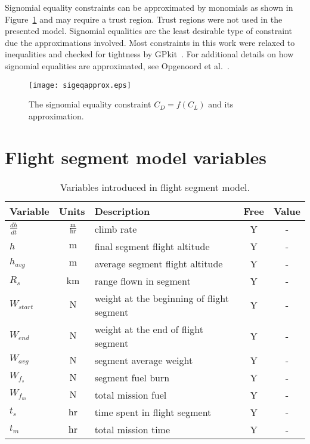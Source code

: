 Signomial equality constraints can be approximated by monomials as shown in
Figure~\ref{f:sigeq} and may require a trust region. Trust regions were not
used in the presented model. Signomial equalities are the least desirable type
of constraint due the approximations involved. Most constraints in this work
were relaxed to inequalities and checked for tightness by GPkit~\cite{gpkit}. For
additional details on how signomial equalities are approximated, see Opgenoord
et al.~\cite{sigeqpaper}.

\begin{figure}[!ht]
\centering
\texttt{[image: sigeqapprox.eps]}
\caption{The signomial equality constraint $C_{D} = f(C_{L})$ and its
approximation.}\label{f:sigeq}
\end{figure}

\section{Flight segment model variables}
\label{a:flightprofilevars}

\begin{footnotesize}
    \begin{table}
        \centering
        \begin{tabular}{ l c l c c }
            \toprule
            Variable & Units & Description & Free & Value \\
            \midrule
            $\frac{dh}{dt}$  & $~\mathrm{\tfrac{m}{hr}}$ & climb rate & Y & - \\
            $h$ & $~\mathrm{m}$ & final segment flight altitude & Y & - \\
            $h_{avg}$ & $~\mathrm{m}$ & average segment flight altitude & Y & - \\
            $R_s$ & $~\mathrm{km}$ & range flown in segment & Y & -\\
            $W_{start}$  & $~\mathrm{N}$ & weight at the beginning of flight segment & Y & - \\
            $W_{end}$ & $~\mathrm{N}$ & weight at the end of flight segment & Y & - \\
            $W_{avg}$ & $~\mathrm{N}$ & segment average weight & Y & - \\
            $W_{f_s}$ & $~\mathrm{N}$ & segment fuel burn & Y & - \\
            $W_{f_m}$  & $~\mathrm{N}$ & total mission fuel & Y & -\\
            $t_s$ & $~\mathrm{hr}$ & time spent in flight segment & Y & - \\
            $t_m$  & $~\mathrm{hr}$ & total mission time & Y & - \\
            \bottomrule
        \end{tabular}
        \caption{Variables introduced in flight segment model.}
        \label{t:vars_flightprofile}
    \end{table}
\end{footnotesize}
